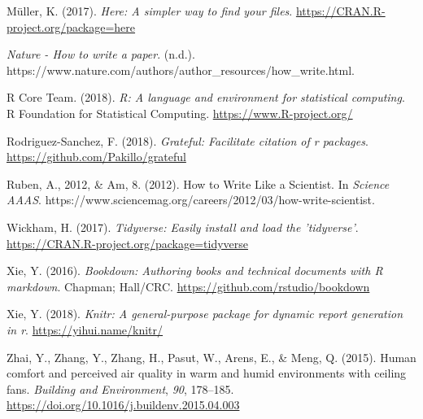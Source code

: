 \documentclass[]{elsarticle} %
\begin{document}
\leavevmode\hypertarget{ref-here}{}%
Müller, K. (2017). \emph{Here: A simpler way to find your files}. \url{https://CRAN.R-project.org/package=here}

\leavevmode\hypertarget{ref-NatureHowWrite}{}%
\emph{Nature - How to write a paper}. (n.d.). https://www.nature.com/authors/author\_resources/how\_write.html.

\leavevmode\hypertarget{ref-base}{}%
R Core Team. (2018). \emph{R: A language and environment for statistical computing}. R Foundation for Statistical Computing. \url{https://www.R-project.org/}

\leavevmode\hypertarget{ref-grateful}{}%
Rodriguez-Sanchez, F. (2018). \emph{Grateful: Facilitate citation of r packages}. \url{https://github.com/Pakillo/grateful}

\leavevmode\hypertarget{ref-rubenHowWriteScientist2012}{}%
Ruben, A., 2012, \& Am, 8. (2012). How to Write Like a Scientist. In \emph{Science \textbar{} AAAS}. https://www.sciencemag.org/careers/2012/03/how-write-scientist.

\leavevmode\hypertarget{ref-tidyverse}{}%
Wickham, H. (2017). \emph{Tidyverse: Easily install and load the 'tidyverse'}. \url{https://CRAN.R-project.org/package=tidyverse}

\leavevmode\hypertarget{ref-bookdown}{}%
Xie, Y. (2016). \emph{Bookdown: Authoring books and technical documents with R markdown}. Chapman; Hall/CRC. \url{https://github.com/rstudio/bookdown}

\leavevmode\hypertarget{ref-knitr}{}%
Xie, Y. (2018). \emph{Knitr: A general-purpose package for dynamic report generation in r}. \url{https://yihui.name/knitr/}

\leavevmode\hypertarget{ref-zhaiHumanComfortPerceived2015a}{}%
Zhai, Y., Zhang, Y., Zhang, H., Pasut, W., Arens, E., \& Meng, Q. (2015). Human comfort and perceived air quality in warm and humid environments with ceiling fans. \emph{Building and Environment}, \emph{90}, 178--185. \url{https://doi.org/10.1016/j.buildenv.2015.04.003}
\end{document}
